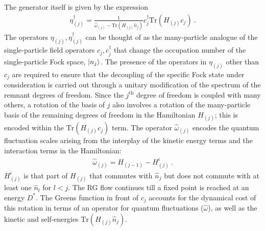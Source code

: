 \documentclass[reprint,prb,superscriptaddress]{revtex4-2}
\begin{document}
The generator itself is given by the expression~\cite{anirbanurg1,anirbanurg2}
\begin{equation}\begin{aligned}
	\eta^\dagger_{(j)} = \frac{1}{\hat \omega_{(j)} - \text{Tr}\left(H_{(j)} \hat n_{j}\right) } c^\dagger_{j} \text{Tr}\left(H_{(j)}c_{j}\right)~.
\end{aligned}\end{equation}
{\color{blue}The operators \(\eta_{(j)},\eta^\dagger_{(j)}\) can be thought of as the many-particle analogue of the single-particle field operators \(c_j,c^\dagger_j\) that change the occupation number of the single-particle Fock space, \(\ket{n_j}\). The presence of the operators in $\eta_{(j)}$ other than $c_j$ are required to ensure that the decoupling of the specific Fock state under consideration is carried out through a unitary modification of the spectrum of the remnant degrees of freedom. Since the \(j^\text{th}\) degree of freedom is coupled with many others, a rotation of the basis of \(j\) also involves a rotation of the many-particle basis of the remaining degrees of freedom in the Hamiltonian \(H_{(j)}\); this is encoded within the \(\text{Tr}\left(H_{(j)} c_j\right) \) term.}
The operator \(\hat \omega_{(j)}\) encodes the quantum fluctuation scales arising from the interplay of the kinetic energy terms and the interaction terms in the Hamiltonian:
\begin{equation}\begin{aligned}
	\hat \omega_{(j)} = H_{(j-1)} - H^i_{(j)}~.
\end{aligned}\end{equation}
\(H^i_{(j)}\) is that part of \(H_{(j)}\) that commutes with \(\hat n_j\) but does not commute with at least one \(\hat n_l\) for \(l < j\). The RG flow continues till a fixed point is reached at an energy \(D^*\).
{\color{blue} The Greens function in front of $c_j$ accounts for the dynamical cost of this rotation in terms of an operator for quantum fluctuations (\(\hat \omega\)), as well as the kinetic and self-energies \(\text{Tr}\left( H_{(j)}\hat n_j \right) \).}
\end{document}
